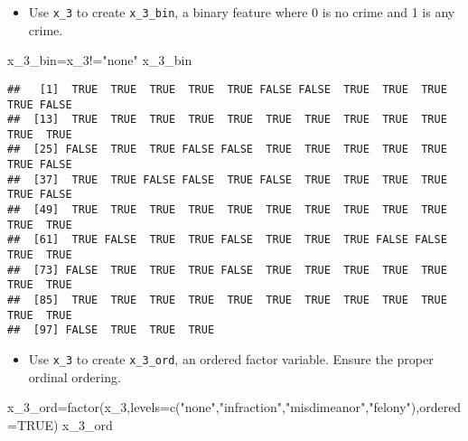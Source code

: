 \documentclass[
]{article}
\newenvironment{Shaded}{\begin{snugshade}}{\end{snugshade}}
\newcommand{\AttributeTok}[1]{\textcolor[rgb]{0.77,0.63,0.00}{#1}}
\newcommand{\ConstantTok}[1]{\textcolor[rgb]{0.00,0.00,0.00}{#1}}
\newcommand{\FunctionTok}[1]{\textcolor[rgb]{0.00,0.00,0.00}{#1}}
\newcommand{\NormalTok}[1]{#1}
\newcommand{\OtherTok}[1]{\textcolor[rgb]{0.56,0.35,0.01}{#1}}
\newcommand{\SpecialCharTok}[1]{\textcolor[rgb]{0.00,0.00,0.00}{#1}}
\newcommand{\StringTok}[1]{\textcolor[rgb]{0.31,0.60,0.02}{#1}}
\providecommand{\tightlist}{%
  \setlength{\itemsep}{0pt}\setlength{\parskip}{0pt}}
\begin{document}
\begin{itemize}
\tightlist
\item
  Use \texttt{x\_3} to create \texttt{x\_3\_bin}, a binary feature where
  0 is no crime and 1 is any crime.
\end{itemize}

\begin{Shaded}
\begin{Highlighting}[]
\NormalTok{x\_3\_bin}\OtherTok{=}\NormalTok{x\_3}\SpecialCharTok{!=}\StringTok{"none"}
\NormalTok{x\_3\_bin}
\end{Highlighting}
\end{Shaded}

\begin{verbatim}
##   [1]  TRUE  TRUE  TRUE  TRUE  TRUE FALSE FALSE  TRUE  TRUE  TRUE  TRUE FALSE
##  [13]  TRUE  TRUE  TRUE  TRUE  TRUE  TRUE  TRUE  TRUE  TRUE  TRUE  TRUE  TRUE
##  [25] FALSE  TRUE  TRUE FALSE FALSE  TRUE  TRUE  TRUE  TRUE  TRUE  TRUE FALSE
##  [37]  TRUE  TRUE FALSE FALSE  TRUE FALSE  TRUE  TRUE  TRUE  TRUE  TRUE FALSE
##  [49]  TRUE  TRUE  TRUE  TRUE  TRUE  TRUE  TRUE  TRUE  TRUE  TRUE  TRUE  TRUE
##  [61]  TRUE FALSE  TRUE  TRUE FALSE  TRUE  TRUE  TRUE FALSE FALSE  TRUE  TRUE
##  [73] FALSE  TRUE  TRUE  TRUE FALSE  TRUE  TRUE  TRUE  TRUE  TRUE  TRUE  TRUE
##  [85]  TRUE  TRUE  TRUE  TRUE  TRUE  TRUE  TRUE  TRUE  TRUE  TRUE  TRUE  TRUE
##  [97] FALSE  TRUE  TRUE  TRUE
\end{verbatim}

\begin{itemize}
\tightlist
\item
  Use \texttt{x\_3} to create \texttt{x\_3\_ord}, an ordered factor
  variable. Ensure the proper ordinal ordering.
\end{itemize}

\begin{Shaded}
\begin{Highlighting}[]
\NormalTok{x\_3\_ord}\OtherTok{=}\FunctionTok{factor}\NormalTok{(x\_3,}\AttributeTok{levels=}\FunctionTok{c}\NormalTok{(}\StringTok{"none"}\NormalTok{,}\StringTok{"infraction"}\NormalTok{,}\StringTok{"misdimeanor"}\NormalTok{,}\StringTok{"felony"}\NormalTok{),}\AttributeTok{ordered=}\ConstantTok{TRUE}\NormalTok{)}
\NormalTok{x\_3\_ord}
\end{Highlighting}
\end{Shaded}
\end{document}
